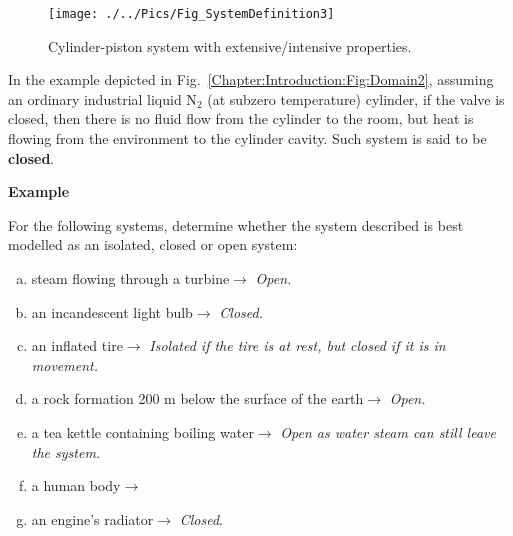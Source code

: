    \begin{figure}[h]
     \begin{center}
        \texttt{[image: ./../Pics/Fig\_SystemDefinition3]}
        \caption{Cylinder-piston system with extensive/intensive properties.}\label{Chapter:Introduction:Fig:Domain3}
     \end{center}
   \end{figure}

   In the example depicted in Fig.~\ref{Chapter:Introduction:Fig:Domain2}, assuming an ordinary industrial liquid N$_{2}$ (at subzero temperature) cylinder, if the valve is closed, then there is no fluid flow from the cylinder to the room, but heat is flowing from the environment to the cylinder cavity. Such system is said to be {\bf closed}.
   
\medskip
\begin{MyExample}{\begin{center}{\bf Example}\end{center}}
\begin{example}\label{Chapter:Introduction:Example1}
  \citep{Reisel_Book} For the following systems, determine whether the system described is best modelled as an isolated, closed or open system:
  \begin{enumerate}[a)]
     \item steam flowing through a turbine\;\;$\rightarrow$\;\; {\it Open.}
     \item an incandescent light bulb\;\;$\rightarrow$\;\; {\it Closed.}
     \item an inflated tire\;\;$\rightarrow$\;\; {\it Isolated if the tire is at rest, but closed if it is in movement.}
     \item a rock formation 200 m below the surface of the earth\;\;$\rightarrow$\;\; {\it Open.}
     \item a tea kettle containing boiling water\;\;$\rightarrow$\;\; {\it Open as water steam can still leave the system.}
     \item a human body\;\;$\rightarrow$\;
     \item an engine's radiator\;\;$\rightarrow$\;\; {\it Closed}.
  \end{enumerate}
\end{example}
\end{MyExample}

